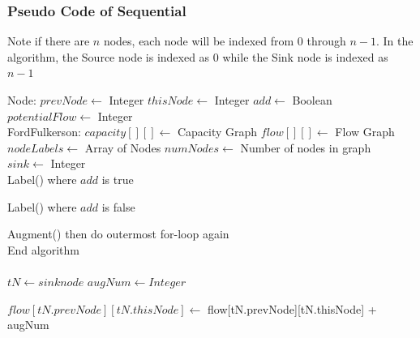     \subsubsection{Pseudo Code of Sequential}
    Note if there are $n$ nodes, each node will be indexed from 0 through $n-1$. In the algorithm, the Source node is indexed as 0 while the Sink node is indexed as $n-1$
    \begin{algorithmic}
        \State Node:
            \State $prevNode \gets$ Integer
            \State $thisNode \gets$ Integer
            \State $add \gets$ Boolean
            \State $potentialFlow \gets$ Integer\\
            
        
        \State FordFulkerson:
            \State $capacity[][] \gets$ Capacity Graph
            \State $flow[][] \gets$ Flow Graph
            \State $nodeLabels \gets$ Array of Nodes
            \State $numNodes \gets$ Number of nodes in graph\\
            \State $sink \gets$ Integer\\
            
                            \State
                                    Label() where $add$ is true
                                \EndIf
                                
                                    Label() where $add$ is false
                                \EndIf
                        \EndIf
                    \EndFor
                    
                        Augment()
                        then do outermost for-loop again
                    \EndIf
                \EndFor
            \EndFor\\
            
            End algorithm\\\\

            \State $tN \gets sink node$ 
            \State $augNum \gets Integer$ 
        
                    \State $flow[tN.prevNode][tN.thisNode] \gets$ flow[tN.prevNode][tN.thisNode] + augNum
                

\end{algorithmic}
